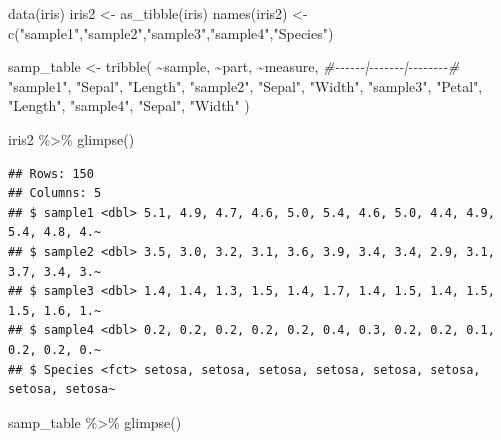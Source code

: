 \documentclass[
]{book}
\newenvironment{Shaded}{\begin{snugshade}}{\end{snugshade}}
\newcommand{\CommentTok}[1]{\textcolor[rgb]{0.56,0.35,0.01}{\textit{#1}}}
\newcommand{\FunctionTok}[1]{\textcolor[rgb]{0.00,0.00,0.00}{#1}}
\newcommand{\NormalTok}[1]{#1}
\newcommand{\OtherTok}[1]{\textcolor[rgb]{0.56,0.35,0.01}{#1}}
\newcommand{\SpecialCharTok}[1]{\textcolor[rgb]{0.00,0.00,0.00}{#1}}
\newcommand{\StringTok}[1]{\textcolor[rgb]{0.31,0.60,0.02}{#1}}
\begin{document}
\begin{Shaded}
\begin{Highlighting}[]
\FunctionTok{data}\NormalTok{(iris)}
\NormalTok{iris2 }\OtherTok{\textless{}{-}} \FunctionTok{as\_tibble}\NormalTok{(iris)}
\FunctionTok{names}\NormalTok{(iris2) }\OtherTok{\textless{}{-}} \FunctionTok{c}\NormalTok{(}\StringTok{"sample1"}\NormalTok{,}\StringTok{"sample2"}\NormalTok{,}\StringTok{"sample3"}\NormalTok{,}\StringTok{"sample4"}\NormalTok{,}\StringTok{"Species"}\NormalTok{)}

\NormalTok{samp\_table }\OtherTok{\textless{}{-}} \FunctionTok{tribble}\NormalTok{(}
                      \SpecialCharTok{\textasciitilde{}}\NormalTok{sample, }\SpecialCharTok{\textasciitilde{}}\NormalTok{part, }\SpecialCharTok{\textasciitilde{}}\NormalTok{measure,}
                      \CommentTok{\#{-}{-}{-}{-}{-}{-}|{-}{-}{-}{-}{-}{-}{-}|{-}{-}{-}{-}{-}{-}{-}{-}\#}
                      \StringTok{"sample1"}\NormalTok{, }\StringTok{"Sepal"}\NormalTok{, }\StringTok{"Length"}\NormalTok{,}
                      \StringTok{"sample2"}\NormalTok{, }\StringTok{"Sepal"}\NormalTok{, }\StringTok{"Width"}\NormalTok{,}
                      \StringTok{"sample3"}\NormalTok{, }\StringTok{"Petal"}\NormalTok{, }\StringTok{"Length"}\NormalTok{,}
                      \StringTok{"sample4"}\NormalTok{, }\StringTok{"Sepal"}\NormalTok{, }\StringTok{"Width"}
\NormalTok{                     )}


\NormalTok{iris2 }\SpecialCharTok{\%\textgreater{}\%} \FunctionTok{glimpse}\NormalTok{()}
\end{Highlighting}
\end{Shaded}

\begin{verbatim}
## Rows: 150
## Columns: 5
## $ sample1 <dbl> 5.1, 4.9, 4.7, 4.6, 5.0, 5.4, 4.6, 5.0, 4.4, 4.9, 5.4, 4.8, 4.~
## $ sample2 <dbl> 3.5, 3.0, 3.2, 3.1, 3.6, 3.9, 3.4, 3.4, 2.9, 3.1, 3.7, 3.4, 3.~
## $ sample3 <dbl> 1.4, 1.4, 1.3, 1.5, 1.4, 1.7, 1.4, 1.5, 1.4, 1.5, 1.5, 1.6, 1.~
## $ sample4 <dbl> 0.2, 0.2, 0.2, 0.2, 0.2, 0.4, 0.3, 0.2, 0.2, 0.1, 0.2, 0.2, 0.~
## $ Species <fct> setosa, setosa, setosa, setosa, setosa, setosa, setosa, setosa~
\end{verbatim}

\begin{Shaded}
\begin{Highlighting}[]
\NormalTok{samp\_table }\SpecialCharTok{\%\textgreater{}\%} \FunctionTok{glimpse}\NormalTok{()}
\end{Highlighting}
\end{Shaded}
\end{document}
